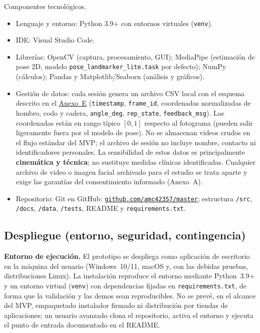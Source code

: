 \documentclass[11pt,a4paper]{article}
\begin{document}
\vspace{0.6em}
Componentes tecnológicos.
\begin{itemize}
  \item Lenguaje y entorno: Python 3.9+ con entornos virtuales (\texttt{venv}).
  \item IDE: Visual Studio Code.
  \item Librerías: OpenCV (captura, procesamiento, GUI); MediaPipe (estimación de pose 2D, modelo \texttt{pose\_landmarker\_lite.task} por defecto); NumPy (cálculos); Pandas y Matplotlib/Seaborn (análisis y gráficos).
  \item Gestión de datos: cada sesión genera un archivo CSV local con el esquema descrito en el \hyperref[anexo:csv-sesion]{Anexo~E} (\texttt{timestamp}, \texttt{frame\_id}, coordenadas normalizadas de hombro, codo y cadera, \texttt{angle\_deg}, \texttt{rep\_state}, \texttt{feedback\_msg}). Las coordenadas están en rango típico $[0,1]$ respecto al fotograma (pueden salir ligeramente fuera por el modelo de pose). No se almacenan videos crudos en el flujo estándar del MVP; el archivo de sesión no incluye nombre, contacto ni identificadores personales. La sensibilidad de estos datos es principalmente \textbf{cinemática y técnica}; no sustituye medidas clínicas identificadas. Cualquier archivo de video o imagen facial archivado para el estudio se trata aparte y exige las garantías del consentimiento informado (Anexo~A).
  \item Repositorio: Git en GitHub: \href{https://github.com/amc42357/master}{\texttt{github.com/amc42357/master}}; estructura \texttt{/src}, \texttt{/docs}, \texttt{/data}, \texttt{/tests}, README y \texttt{requirements.txt}.
\end{itemize}

\subsection{Despliegue (entorno, seguridad, contingencia)}
\textbf{Entorno de ejecución.} El prototipo se despliega como aplicación de escritorio en la máquina del usuario (Windows~10/11, macOS y, con las debidas pruebas, distribuciones Linux). La instalación reproduce el entorno mediante Python~3.9+ y un entorno virtual (\texttt{venv}) con dependencias fijadas en \texttt{requirements.txt}, de forma que la validación y las demos sean reproducibles. No se prevé, en el alcance del MVP, empaquetado instalador firmado ni distribución por tiendas de aplicaciones; un usuario avanzado clona el repositorio, activa el entorno y ejecuta el punto de entrada documentado en el README.
\end{document}
